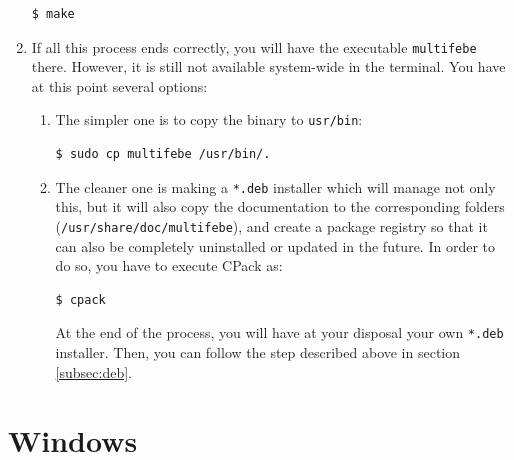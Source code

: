 \documentclass[a4paper,fleqn]{book}
\begin{document}
\begin{enumerate}
\begin{Verbatim}[frame=single, fontsize=\small]
$ make
\end{Verbatim}
    \item If all this process ends correctly, you will have the executable \texttt{multifebe} there. However, it is still not available system-wide in the terminal. You have at this point several options:
    \begin{enumerate}
    \item The simpler one is to copy the binary to \texttt{usr/bin}:
\begin{Verbatim}[frame=single, fontsize=\small]
$ sudo cp multifebe /usr/bin/.
\end{Verbatim}
    \item The cleaner one is making a \texttt{*.deb} installer which will manage not only this, but it will also copy the documentation to the corresponding folders (\texttt{/usr/share/doc/multifebe}), and create a package registry so that it can also be completely uninstalled or updated in the future. In order to do so, you have to execute CPack as:
\begin{Verbatim}[frame=single, fontsize=\small]
$ cpack
\end{Verbatim}
    At the end of the process, you will have at your disposal your own \texttt{*.deb} installer. Then, you can follow the step described above in section \ref{subsec:deb}.
    \end{enumerate}
\end{enumerate}

\section{Windows}
\end{document}

